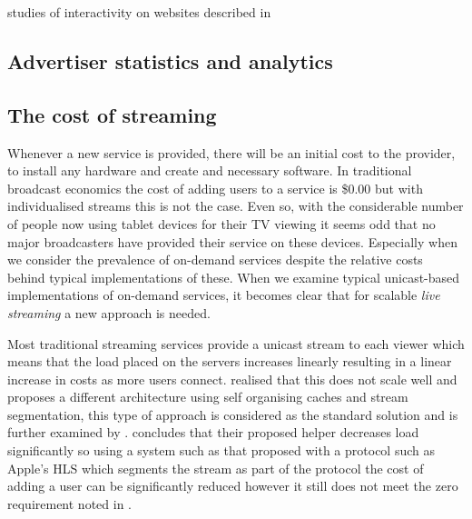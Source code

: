 	\citep{integrated-approach-advertising}


	studies of interactivity on websites described in \citet{Teo2003281}

\subsection{Advertiser statistics and analytics}

\subsection{The cost of streaming}
	Whenever a new service is provided, there will be an initial cost to the provider, to install any hardware and create and necessary software. In traditional broadcast economics \citep{broadcastEconomics} the cost of adding users to a service is \$0.00 but with individualised streams this is not the case. Even so, with the considerable number of people now using tablet devices for their TV viewing it seems odd that no major broadcasters have provided their service on these devices. Especially when we consider the prevalence of on-demand services despite the relative costs behind typical implementations of these. When we examine typical unicast-based implementations of on-demand services, it becomes clear that for scalable \textit{live streaming} a new approach is needed.

	Most traditional streaming services provide a unicast stream to each viewer which means that the load placed on the servers increases linearly resulting in a linear increase in costs as more users connect. \citet{cachedStream} realised that this does not scale well and proposes a different architecture using self organising caches and stream segmentation, this type of approach is considered as the standard solution and is further examined by \citet{segmentProxyCaching}. \citet{cachedStream} concludes that their proposed helper decreases load significantly so using a system such as that proposed with a protocol such as Apple's HLS\cite{HLS} which segments the stream as part of the protocol the cost of adding a user can be significantly reduced however it still does not meet the zero requirement noted in \citep{broadcastEconomics}.

